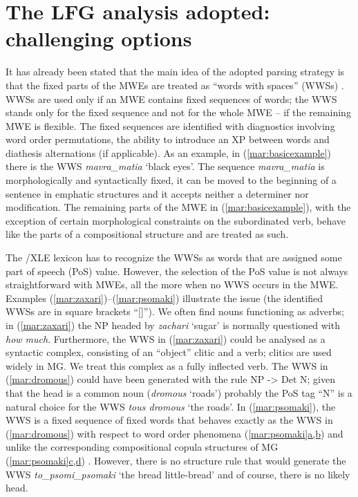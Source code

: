 \documentclass[output=paper]{langsci/langscibook}
\begin{document}
\section{The LFG analysis adopted: challenging options}
\label{mar:Ssec2}
It has already been stated that the main idea of the adopted parsing strategy is that the fixed parts of the MWEs are treated as “words with spaces” (WWSs) \citep{sag02}.  WWSs are used only if an MWE contains fixed sequences of words; the WWS stands only for the fixed sequence and not for the whole MWE -- if the remaining MWE is flexible. The fixed sequences are identified with diagnostics involving word order permutations, the ability to introduce an XP between words and diathesis alternations (if applicable). As an example, in (\ref{mar:basicexample}) there is the WWS \textit{mavra\_matia} `black eyes'. The sequence \textit{mavra\_matia} is morphologically and syntactically fixed, it can be moved to the beginning of a sentence in emphatic structures and it accepts neither a determiner nor modification. The remaining parts of the MWE in (\ref{mar:basicexample}), with the exception of certain morphological constraints on the subordinated verb, behave like the parts of a compositional structure and are treated as such. 

The /XLE lexicon has to recognize the WWSs as words that are assigned some part of speech (PoS) value. However, the selection of the PoS value is not always straightforward with MWEs, all the more when no WWS occurs in the MWE. Examples (\ref{mar:zaxari})--(\ref{mar:psomaki}) illustrate the issue (the identified WWSs are in square brackets ``[]''). We often find nouns functioning as adverbs; in (\ref{mar:zaxari}) the NP headed by \textit{zachari} `sugar' is normally questioned with \textit{how much}. Furthermore, the WWS in (\ref{mar:zaxari}) could be analysed as a syntactic complex, consisting of an  ``object'' clitic and a verb; clitics are used widely in MG.  We treat this complex as a fully inflected verb. The WWS in (\ref{mar:dromous}) could have been generated with the rule NP -> Det  N; given that the head is a common noun (\textit{dromous} `roads') probably the PoS tag ``N'' is a natural choice for the WWS \textit{tous dromous} `the roads'. In (\ref{mar:psomaki}), the WWS is a fixed sequence of fixed words that behaves exactly as the WWS in (\ref{mar:dromous})  with respect to word order phenomena (\hyperref[mar:psomaki]{\ref*{mar:psomaki}a,b}) %
and unlike the corresponding compositional copula structures of MG (\hyperref[mar:psomaki]{\ref*{mar:psomaki}c,d})%
. However, there is no  structure rule that would generate the WWS \textit{to\_psomi\_psomaki} `the bread little-bread' and of course, there is no likely head. 
\end{document}
